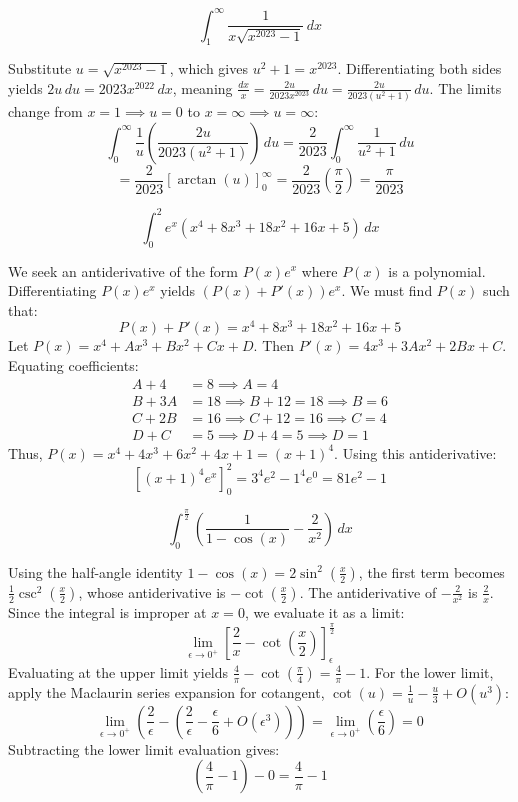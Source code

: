 \begin{questions}
    \question \[ \int_1^\infty \frac{1}{x\sqrt{x^{2023} - 1}} \,dx \]
    \begin{solution}
        Substitute $u = \sqrt{x^{2023} - 1}$, which gives $u^2 + 1 = x^{2023}$. Differentiating both sides yields $2u \,du = 2023x^{2022} \,dx$, meaning $\frac{dx}{x} = \frac{2u}{2023x^{2023}} \,du = \frac{2u}{2023(u^2 + 1)} \,du$. The limits change from $x = 1 \implies u = 0$ to $x = \infty \implies u = \infty$:
        \[ \int_0^\infty \frac{1}{u} \left( \frac{2u}{2023(u^2 + 1)} \right) \,du = \frac{2}{2023} \int_0^\infty \frac{1}{u^2 + 1} \,du \]
        \[ = \frac{2}{2023} \left[ \arctan(u) \right]_0^\infty = \frac{2}{2023} \left( \frac{\pi}{2} \right) = \frac{\pi}{2023} \]
    \end{solution}

    \question \[ \int_0^2 e^x (x^4 + 8x^3 + 18x^2 + 16x + 5) \,dx \]
    \begin{solution}
        We seek an antiderivative of the form $P(x)e^x$ where $P(x)$ is a polynomial. Differentiating $P(x)e^x$ yields $(P(x) + P'(x))e^x$. We must find $P(x)$ such that:
        \[ P(x) + P'(x) = x^4 + 8x^3 + 18x^2 + 16x + 5 \]
        Let $P(x) = x^4 + Ax^3 + Bx^2 + Cx + D$. Then $P'(x) = 4x^3 + 3Ax^2 + 2Bx + C$. Equating coefficients:
        \begin{align*}
            A + 4 &= 8 \implies A = 4 \\
            B + 3A &= 18 \implies B + 12 = 18 \implies B = 6 \\
            C + 2B &= 16 \implies C + 12 = 16 \implies C = 4 \\
            D + C &= 5 \implies D + 4 = 5 \implies D = 1
        \end{align*}
        Thus, $P(x) = x^4 + 4x^3 + 6x^2 + 4x + 1 = (x + 1)^4$. Using this antiderivative:
        \[ \left[ (x + 1)^4 e^x \right]_0^2 = 3^4 e^2 - 1^4 e^0 = 81e^2 - 1 \]
    \end{solution}

    \question \[ \int_0^{\frac{\pi}{2}} \left( \frac{1}{1 - \cos(x)} - \frac{2}{x^2} \right) \,dx \]
    \begin{solution}
        Using the half-angle identity $1 - \cos(x) = 2\sin^2\left(\frac{x}{2}\right)$, the first term becomes $\frac{1}{2}\csc^2\left(\frac{x}{2}\right)$, whose antiderivative is $-\cot\left(\frac{x}{2}\right)$. The antiderivative of $-\frac{2}{x^2}$ is $\frac{2}{x}$. Since the integral is improper at $x = 0$, we evaluate it as a limit:
        \[ \lim_{\epsilon \to 0^+} \left[ \frac{2}{x} - \cot\left(\frac{x}{2}\right) \right]_\epsilon^{\frac{\pi}{2}} \]
        Evaluating at the upper limit yields $\frac{4}{\pi} - \cot\left(\frac{\pi}{4}\right) = \frac{4}{\pi} - 1$. For the lower limit, apply the Maclaurin series expansion for cotangent, $\cot(u) = \frac{1}{u} - \frac{u}{3} + O(u^3)$:
        \[ \lim_{\epsilon \to 0^+} \left( \frac{2}{\epsilon} - \left( \frac{2}{\epsilon} - \frac{\epsilon}{6} + O(\epsilon^3) \right) \right) = \lim_{\epsilon \to 0^+} \left( \frac{\epsilon}{6} \right) = 0 \]
        Subtracting the lower limit evaluation gives:
        \[ \left( \frac{4}{\pi} - 1 \right) - 0 = \frac{4}{\pi} - 1 \]
    \end{solution}


\end{questions}
